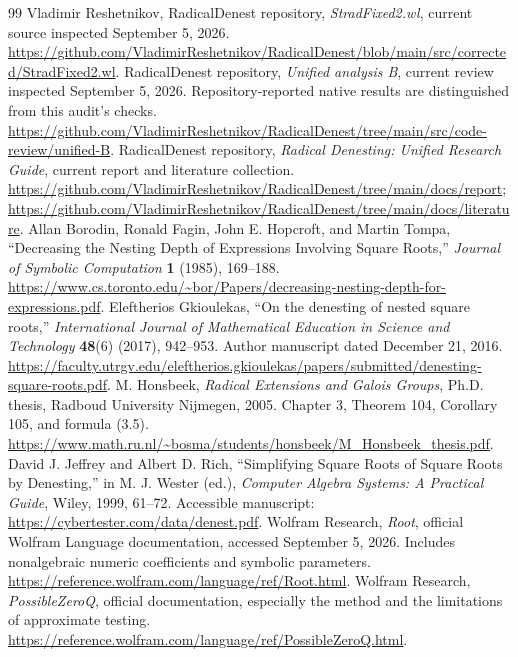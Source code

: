 \documentclass[11pt,letterpaper]{article}
\numberwithin{equation}{section}
\theoremstyle{definition}\newtheorem{definition}[theorem]{Definition}
\theoremstyle{remark}\newtheorem{remark}[theorem]{Remark}
\newcommand{\code}[1]{\texttt{\detokenize{#1}}}
\begin{document}
\begingroup
\small
\begin{thebibliography}{99}
 Vladimir Reshetnikov, RadicalDenest repository, \emph{StradFixed2.wl}, current \code{main} source inspected September 5, 2026. \url{https://github.com/VladimirReshetnikov/RadicalDenest/blob/main/src/corrected/StradFixed2.wl}.
 RadicalDenest repository, \emph{Unified analysis B}, current review inspected September 5, 2026. Repository-reported native results are distinguished from this audit's checks. \url{https://github.com/VladimirReshetnikov/RadicalDenest/tree/main/src/code-review/unified-B}.
 RadicalDenest repository, \emph{Radical Denesting: Unified Research Guide}, current report and literature collection. \url{https://github.com/VladimirReshetnikov/RadicalDenest/tree/main/docs/report}; \url{https://github.com/VladimirReshetnikov/RadicalDenest/tree/main/docs/literature}.
 Allan Borodin, Ronald Fagin, John E. Hopcroft, and Martin Tompa, ``Decreasing the Nesting Depth of Expressions Involving Square Roots,'' \emph{Journal of Symbolic Computation} \textbf{1} (1985), 169--188. \url{https://www.cs.toronto.edu/~bor/Papers/decreasing-nesting-depth-for-expressions.pdf}.
 Eleftherios Gkioulekas, ``On the denesting of nested square roots,'' \emph{International Journal of Mathematical Education in Science and Technology} \textbf{48}(6) (2017), 942--953. Author manuscript dated December 21, 2016. \url{https://faculty.utrgv.edu/eleftherios.gkioulekas/papers/submitted/denesting-square-roots.pdf}.
 M. Honsbeek, \emph{Radical Extensions and Galois Groups}, Ph.D. thesis, Radboud University Nijmegen, 2005. Chapter 3, Theorem 104, Corollary 105, and formula (3.5). \url{https://www.math.ru.nl/~bosma/students/honsbeek/M_Honsbeek_thesis.pdf}.
 David J. Jeffrey and Albert D. Rich, ``Simplifying Square Roots of Square Roots by Denesting,'' in M. J. Wester (ed.), \emph{Computer Algebra Systems: A Practical Guide}, Wiley, 1999, 61--72. Accessible manuscript: \url{https://cybertester.com/data/denest.pdf}.
 Wolfram Research, \emph{Root}, official Wolfram Language documentation, accessed September 5, 2026. Includes nonalgebraic numeric coefficients and symbolic parameters. \url{https://reference.wolfram.com/language/ref/Root.html}.
 Wolfram Research, \emph{PossibleZeroQ}, official documentation, especially the \code{"ExactAlgebraics"} method and the limitations of approximate testing. \url{https://reference.wolfram.com/language/ref/PossibleZeroQ.html}.

\end{thebibliography}
\end{document}
